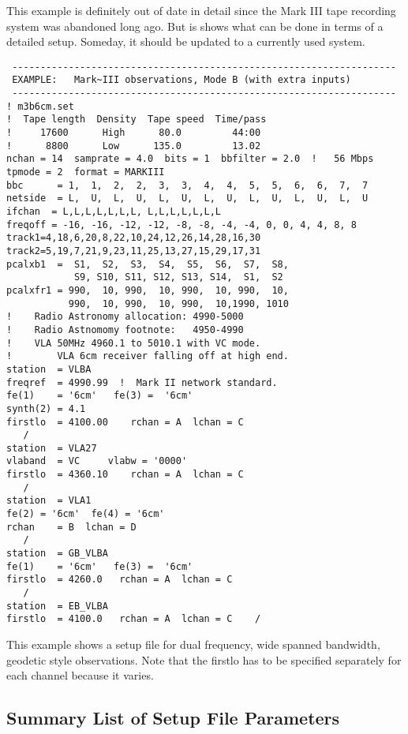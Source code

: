 \documentclass{report}
\begin{document}
This example is definitely out of date in detail since the Mark III
tape recording system was abandoned long ago.  But is shows what can
be done in terms of a detailed setup.  Someday, it should be updated
to a currently used system.


\begin{verbatim}
 --------------------------------------------------------------------
 EXAMPLE:   Mark~III observations, Mode B (with extra inputs)
 --------------------------------------------------------------------
! m3b6cm.set
!  Tape length  Density  Tape speed  Time/pass
!     17600      High      80.0         44:00
!      8800      Low      135.0         13.02
nchan = 14  samprate = 4.0  bits = 1  bbfilter = 2.0  !   56 Mbps
tpmode = 2  format = MARKIII
bbc      = 1,  1,  2,  2,  3,  3,  4,  4,  5,  5,  6,  6,  7,  7
netside  = L,  U,  L,  U,  L,  U,  L,  U,  L,  U,  L,  U,  L,  U
ifchan  = L,L,L,L,L,L,L, L,L,L,L,L,L,L
freqoff = -16, -16, -12, -12, -8, -8, -4, -4, 0, 0, 4, 4, 8, 8
track1=4,18,6,20,8,22,10,24,12,26,14,28,16,30
track2=5,19,7,21,9,23,11,25,13,27,15,29,17,31
pcalxb1  =  S1,  S2,  S3,  S4,  S5,  S6,  S7,  S8,
            S9, S10, S11, S12, S13, S14,  S1,  S2
pcalxfr1 = 990,  10, 990,  10, 990,  10, 990,  10,
           990,  10, 990,  10, 990,  10,1990, 1010
!    Radio Astronomy allocation: 4990-5000
!    Radio Astnomomy footnote:   4950-4990
!    VLA 50MHz 4960.1 to 5010.1 with VC mode.
!        VLA 6cm receiver falling off at high end.
station  = VLBA
freqref  = 4990.99  !  Mark II network standard.
fe(1)    = '6cm'   fe(3) =  '6cm'
synth(2) = 4.1
firstlo  = 4100.00    rchan = A  lchan = C
   /
station  = VLA27
vlaband  = VC     vlabw = '0000'
firstlo  = 4360.10    rchan = A  lchan = C
   /
station  = VLA1
fe(2) = '6cm'  fe(4) = '6cm'
rchan    = B  lchan = D
   /
station  = GB_VLBA
fe(1)    = '6cm'   fe(3) =  '6cm'
firstlo  = 4260.0   rchan = A  lchan = C
   /
station  = EB_VLBA
firstlo  = 4100.0   rchan = A  lchan = C    /
\end{verbatim}

\newpage

This example shows a setup file for dual frequency, wide spanned
bandwidth, geodetic style observations.  Note that the firstlo
has to be specified separately for each channel because it varies.




\subsection{\label{SSEC:SETLST}Summary List of Setup File Parameters}
\end{document}
